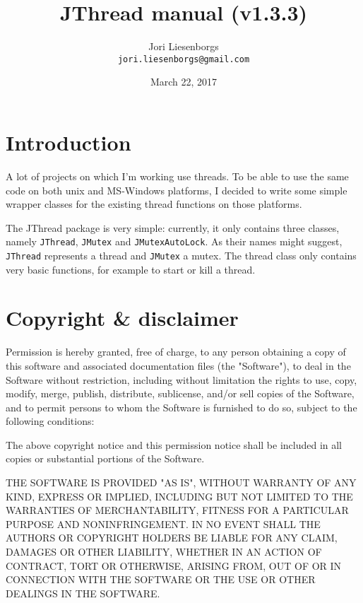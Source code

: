 \documentclass[a4paper,12pt]{article}
\begin{document}
	\title{JThread manual (v1.3.3)}
	\author{Jori Liesenborgs\\
	        {\tt jori.liesenborgs@gmail.com} }
	\date{March 22, 2017}
	\maketitle

	\section{Introduction}

	A lot of projects on which I'm working use threads. To be able to
	use the same code on both unix and MS-Windows platforms, I decided
	to write some simple wrapper classes for the existing thread functions
	on those platforms.

	The JThread package is very simple: currently, it only contains three
	classes, namely {\tt JThread}, {\tt JMutex} and {\tt JMutexAutoLock}. 
	As their names might
	suggest, {\tt JThread} represents a thread and {\tt JMutex} a mutex.
	The thread class only contains very basic functions, for example to
	start or kill a thread.

	\section{Copyright \& disclaimer}

	Permission is hereby granted, free of charge, to any person obtaining a
	copy of this software and associated documentation files (the "Software"),
	to deal in the Software without restriction, including without limitation
	the rights to use, copy, modify, merge, publish, distribute, sublicense,
	and/or sell copies of the Software, and to permit persons to whom the
	Software is furnished to do so, subject to the following conditions:

	The above copyright notice and this permission notice shall be included
	in all copies or substantial portions of the Software.

	THE SOFTWARE IS PROVIDED "AS IS", WITHOUT WARRANTY OF ANY KIND, EXPRESS
	OR IMPLIED, INCLUDING BUT NOT LIMITED TO THE WARRANTIES OF MERCHANTABILITY,
	FITNESS FOR A PARTICULAR PURPOSE AND NONINFRINGEMENT.  IN NO EVENT SHALL
	THE AUTHORS OR COPYRIGHT HOLDERS BE LIABLE FOR ANY CLAIM, DAMAGES OR OTHER
	LIABILITY, WHETHER IN AN ACTION OF CONTRACT, TORT OR OTHERWISE, ARISING
	FROM, OUT OF OR IN CONNECTION WITH THE SOFTWARE OR THE USE OR OTHER DEALINGS
	IN THE SOFTWARE.
\end{document}
